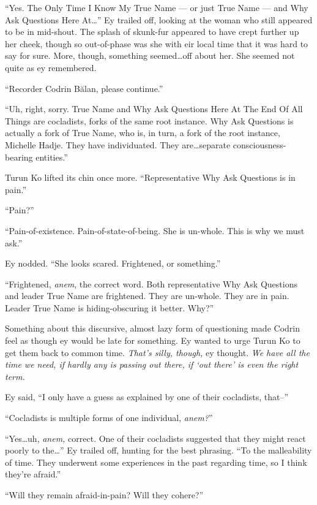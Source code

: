 ``Yes. The Only Time I Know My True Name — or just True Name — and Why Ask Questions Here At\ldots{}'' Ey trailed off, looking at the woman who still appeared to be in mid-shout. The splash of skunk-fur appeared to have crept further up her cheek, though so out-of-phase was she with eir local time that it was hard to say for sure. More, though, something seemed\ldots off about her. She seemed not quite as ey remembered.

``Recorder Codrin Bălan, please continue.''

``Uh, right, sorry. True Name and Why Ask Questions Here At The End Of All Things are cocladists, forks of the same root instance. Why Ask Questions is actually a fork of True Name, who is, in turn, a fork of the root instance, Michelle Hadje. They have individuated. They are\ldots separate consciousness-bearing entities.''

Turun Ko lifted its chin once more. ``Representative Why Ask Questions is in pain.''

``Pain?''

``Pain-of-existence. Pain-of-state-of-being. She is un-whole. This is why we must ask.''

Ey nodded. ``She looks scared. Frightened, or something.''

``Frightened, \emph{anem}, the correct word. Both representative Why Ask Questions and leader True Name are frightened. They are un-whole. They are in pain. Leader True Name is hiding-obscuring it better. Why?''

Something about this discursive, almost lazy form of questioning made Codrin feel as though ey would be late for something. Ey wanted to urge Turun Ko to get them back to common time. \emph{That's silly, though,} ey thought. \emph{We have all the time we need, if hardly any is passing out there, if `out there' is even the right term.}

Ey said, ``I only have a guess as explained by one of their cocladists, that--''

``Cocladists is multiple forms of one individual, \emph{anem?}''

``Yes\ldots uh, \emph{anem,} correct. One of their cocladists suggested that they might react poorly to the\ldots{}'' Ey trailed off, hunting for the best phrasing. ``To the malleability of time. They underwent some experiences in the past regarding time, so I think they're afraid.''

``Will they remain afraid-in-pain? Will they cohere?''

